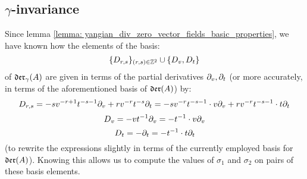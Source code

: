     \subsection{\texorpdfstring{$\gamma$}{}-invariance}
        Since lemma \ref{lemma: yangian_div_zero_vector_fields_basic_properties}, we have known how the elements of the basis:
            $$\{D_{r, s}\}_{(r, s) \in \mathbb{Z}^2} \cup \{D_v, D_t\}$$
        of $\mathfrak{der}_{\gamma}(A)$ are given in terms of the partial derivatives $\partial_v, \partial_t$ (or more accurately, in terms of the aforementioned basis of $\mathfrak{der}(A)$) by:
            $$D_{r, s} = -s v^{-r + 1} t^{-s - 1} \partial_v + r v^{-r} t^{-s} \partial_t = -s v^{-r} t^{-s - 1} \cdot v\partial_v + r v^{-r} t^{-s - 1} \cdot t\partial_t$$
            $$D_v = -v t^{-1} \partial_v = -t^{-1} \cdot v\partial_v$$
            $$D_t = -\partial_t = -t^{-1} \cdot t\partial_t$$
        (to rewrite the expressions slightly in terms of the currently employed basis for $\mathfrak{der}(A)$). Knowing this allows us to compute the values of $\sigma_1$ and $\sigma_2$ on pairs of these basis elements.
